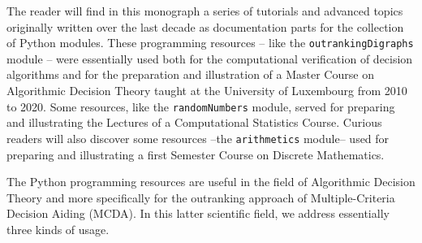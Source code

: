 %
%

\preface






The reader will find in this monograph a series of tutorials and advanced topics originally written over the last decade as documentation parts for the \Digraph collection of Python modules. These programming resources -- like the \texttt{outrankingDigraphs} module -- were essentially used both for the computational verification of decision algorithms and for the preparation and illustration of a Master Course on  Algorithmic Decision Theory taught at the University of Luxembourg from 2010 to 2020. Some resources, like the \texttt{randomNumbers} module, served for preparing and illustrating the Lectures of a Computational Statistics Course. Curious readers will also discover some resources --the \texttt{arithmetics} module-- used for preparing and illustrating a first Semester Course on Discrete Mathematics.


The \Digraph Python programming resources are useful in the field of Algorithmic Decision Theory and more specifically for the outranking approach of Multiple-Criteria Decision Aiding (MCDA). In this latter scientific field, we address essentially three kinds of usage.

